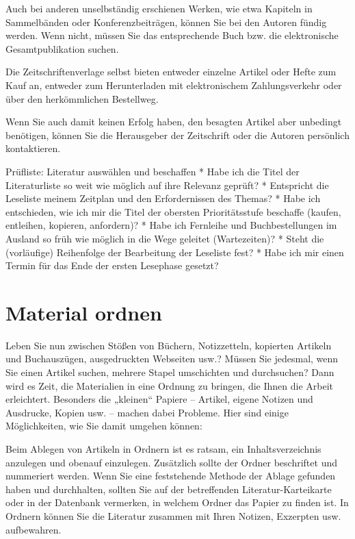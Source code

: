 \documentclass[]{book}
\theoremstyle{definition}
\theoremstyle{definition}
\theoremstyle{definition}
\theoremstyle{remark}
\begin{document}
Auch bei anderen unselbständig erschienen Werken, wie etwa Kapiteln in
Sammelbänden oder Konferenzbeiträgen, können Sie bei den Autoren fündig
werden. Wenn nicht, müssen Sie das entsprechende Buch bzw. die
elektronische Gesamtpublikation suchen.

Die Zeitschriftenverlage selbst bieten entweder einzelne Artikel oder
Hefte zum Kauf an, entweder zum Herunterladen mit elektronischem
Zahlungsverkehr oder über den herkömmlichen Bestellweg.

Wenn Sie auch damit keinen Erfolg haben, den besagten Artikel aber
unbedingt benötigen, können Sie die Herausgeber der Zeitschrift oder die
Autoren persönlich kontaktieren.

Prüfliste: Literatur auswählen und beschaffen * Habe ich die Titel der
Literaturliste so weit wie möglich auf ihre Relevanz geprüft? *
Entspricht die Leseliste meinem Zeitplan und den Erfordernissen des
Themas? * Habe ich entschieden, wie ich mir die Titel der obersten
Prioritätsstufe beschaffe (kaufen, entleihen, kopieren, anfordern)? *
Habe ich Fernleihe und Buchbestellungen im Ausland so früh wie möglich
in die Wege geleitet (Wartezeiten)? * Steht die (vorläufige) Reihenfolge
der Bearbeitung der Leseliste fest? * Habe ich mir einen Termin für das
Ende der ersten Lesephase gesetzt?

\section{Material ordnen}\label{material-ordnen}

Leben Sie nun zwischen Stößen von Büchern, Notizzetteln, kopierten
Artikeln und Buchauszügen, ausgedruckten Webseiten usw.? Müssen Sie
jedesmal, wenn Sie einen Artikel suchen, mehrere Stapel umschichten und
durchsuchen? Dann wird es Zeit, die Materialien in eine Ordnung zu
bringen, die Ihnen die Arbeit erleichtert. Besonders die „kleinen``
Papiere -- Artikel, eigene Notizen und Ausdrucke, Kopien usw. -- machen
dabei Probleme. Hier sind einige Möglichkeiten, wie Sie damit umgehen
können:

Beim Ablegen von Artikeln in Ordnern ist es ratsam, ein
Inhaltsverzeichnis anzulegen und obenauf einzulegen. Zusätzlich sollte
der Ordner beschriftet und nummeriert werden. Wenn Sie eine feststehende
Methode der Ablage gefunden haben und durchhalten, sollten Sie auf der
betreffenden Literatur-Karteikarte oder in der Datenbank vermerken, in
welchem Ordner das Papier zu finden ist. In Ordnern können Sie die
Literatur zusammen mit Ihren Notizen, Exzerpten usw. aufbewahren.
\end{document}
